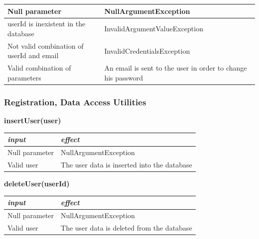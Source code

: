 \documentclass{article}
\begin{document}
\begin{flushleft}
\begin{center}
\begin{tabular}{  |  p{6cm} | p{6cm} |}
    Null parameter & NullArgumentException 
     \\ 
  \hline
  userId is inexistent in the database & InvalidArgumentValueException \\
  \hline
  Not valid combination of userId and email &  InvalidCredentialsException   \\
  \hline
  Valid combination of parameters & An email is sent to the user in order to change his password\\
    \end{tabular}
\end{center}
      
      
       \subsubsection{Registration, Data Access Utilities }
       
         \begin{center}
   \begin {flushleft}
    \textbf{insertUser(user)}
    \end{flushleft}
        \begin{tabular}{  |  p{6cm} | p{6cm} |}
    \hline
    \textit{input} &  \textit{effect} \\
    \hline
    
    Null parameter & NullArgumentException
     \\ 
  \hline
   Valid user & The user data is inserted into the database \\
  \hline

    \end{tabular}
\end{center}


  \begin{center}
   \begin {flushleft}
    \textbf{deleteUser(userId)}
    \end{flushleft}
        \begin{tabular}{  |  p{6cm} | p{6cm} |}
    \hline
    \textit{input} &  \textit{effect} \\
    \hline
    
     Null parameter & NullArgumentException
     \\ 
  \hline
  Valid user &  The user data is deleted from the database
\\
  \hline
  

    \end{tabular}
\end{center}
       

\end{flushleft}
\end{document}
